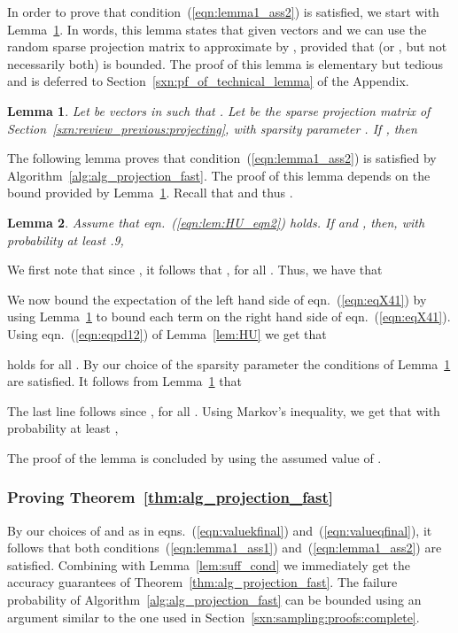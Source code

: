 \documentclass[11pt]{article}
\newtheorem{lemma}{Lemma}
\newenvironment{Proof}{\noindent {\em Proof:}}{\\\hspace*{\fill}\mbox{}}
\begin{document}
In order to prove that condition~(\ref{eqn:lemma1_ass2}) is satisfied, we start with Lemma~\ref{lem:Tmatmult}. In words, this lemma states that given vectors  and  we can use the random sparse projection matrix  to approximate  by , provided that  (or , but not necessarily both) is bounded. The proof of this lemma is elementary but tedious and is deferred to Section~\ref{sxn:pf_of_technical_lemma} of the Appendix.
\begin{lemma}
\label{lem:Tmatmult} Let  be vectors in  such that . Let  be the  sparse projection matrix of Section~\ref{sxn:review_previous:projecting}, with sparsity parameter . If , then

\end{lemma}
\noindent The following lemma proves that condition~(\ref{eqn:lemma1_ass2}) is satisfied by Algorithm~\ref{alg:alg_projection_fast}. The proof of this lemma depends on the bound provided by Lemma~\ref{lem:Tmatmult}. Recall that  and thus .
\begin{lemma} \label{lem:project_lem40pf}
Assume that eqn.~(\ref{eqn:lem:HU_eqn2}) holds. If  and , then, with probability at least .9, 
\end{lemma}
\begin{Proof}
We first note that since , it follows that , for all . Thus, we have that

We now bound the expectation of the left hand side of eqn.~(\ref{eqn:eqX41}) by using Lemma~\ref{lem:Tmatmult} to bound each term on the right hand side of eqn.~(\ref{eqn:eqX41}). Using eqn.~(\ref{eqn:eqpd12}) of Lemma~\ref{lem:HU} we get that

holds for all . By our choice of the sparsity parameter  the conditions of Lemma~\ref{lem:Tmatmult} are satisfied. It follows from Lemma~\ref{lem:Tmatmult} that

The last line follows since , for all . Using Markov's inequality, we get that with probability at least ,

The proof of the lemma is concluded by using the assumed value of .
\end{Proof}

\subsubsection{Proving Theorem~\ref{thm:alg_projection_fast}}

By our choices of  and  as in eqns.~(\ref{eqn:valuekfinal}) and~(\ref{eqn:valueqfinal}), it follows that both conditions~(\ref{eqn:lemma1_ass1}) and~(\ref{eqn:lemma1_ass2}) are satisfied. Combining with Lemma~\ref{lem:suff_cond} we immediately get the accuracy guarantees of Theorem~\ref{thm:alg_projection_fast}. The failure probability of Algorithm~\ref{alg:alg_projection_fast} can be bounded using an argument similar to the one used in Section~\ref{sxn:sampling:proofs:complete}.
\end{document}
